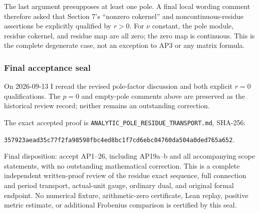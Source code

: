 \documentclass{article}
\begin{document}
The last argument presupposes at least one pole. A final local wording comment therefore asked that Section 7's ``nonzero cokernel'' and noncontinuous-residue assertions be explicitly qualified by \(r>0\). For \(\nu\) constant, the pole module, residue cokernel, and residue map are all zero; the zero map is continuous. This is the complete degenerate case, not an exception to AP3 or any matrix formula.

\subsubsection{Final acceptance seal}\label{endpoint-analytic_pole_review--final-acceptance-seal}

On 2026-09-13 I reread the revised pole-factor discussion and both explicit \(r=0\) qualifications. The \(p=0\) and empty-pole comments above are preserved as the historical review record; neither remains an outstanding correction.

The exact accepted proof is \nolinkurl{ANALYTIC_POLE_RESIDUE_TRANSPORT.md}, SHA-256:

\nolinkurl{357923aead35c77f2fa98598fbc4ed8bc1f7cd6ebc04760da504a0ded765a652}.

Final disposition: accept AP1--26, including AP19a--b and all accompanying scope statements, with no outstanding mathematical correction. This is a complete independent written-proof review of the residue exact sequence, full connection and period transport, actual-unit gauge, ordinary dual, and original formal endpoint. No numerical fixture, arithmetic-zero certificate, Lean replay, positive metric estimate, or additional Frobenius comparison is certified by this seal.

\endgroup
\end{document}
